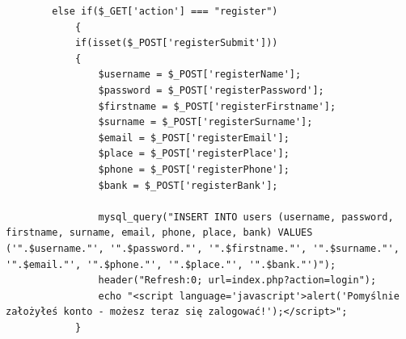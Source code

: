 \documentclass[a4paper]{article}
\begin{document}
	\begin{verbatim}
		else if($_GET['action'] === "register")
    		{
			if(isset($_POST['registerSubmit']))
			{
			    $username = $_POST['registerName'];
			    $password = $_POST['registerPassword'];
			    $firstname = $_POST['registerFirstname'];
			    $surname = $_POST['registerSurname'];
			    $email = $_POST['registerEmail'];
			    $place = $_POST['registerPlace'];
			    $phone = $_POST['registerPhone'];
			    $bank = $_POST['registerBank'];

				mysql_query("INSERT INTO users (username, password, firstname, surname, email, phone, place, bank) VALUES ('".$username."', '".$password."', '".$firstname."', '".$surname."', '".$email."', '".$phone."', '".$place."', '".$bank."')");
				header("Refresh:0; url=index.php?action=login");
				echo "<script language='javascript'>alert('Pomyślnie założyłeś konto - możesz teraz się zalogować!');</script>";
			}


\end{verbatim}
\end{document}
